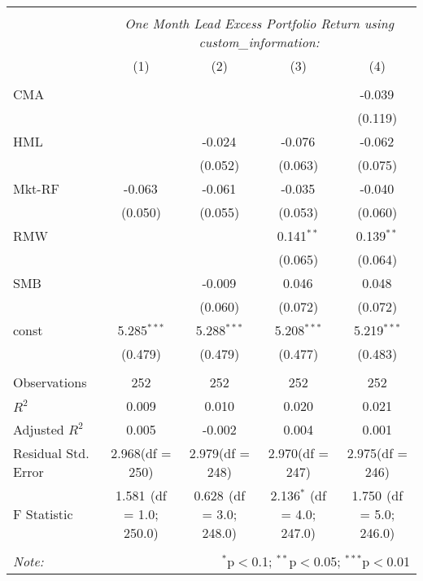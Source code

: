 \begin{table}[!htbp] \centering
\begin{tabular}{@{\extracolsep{5pt}}lcccc}
\\[-1.8ex]\hline
\hline \\[-1.8ex]
& \multicolumn{4}{c}{\textit{One Month Lead Excess Portfolio Return using custom_information:}} \
\cr \cline{4-5}
\\[-1.8ex] & (1) & (2) & (3) & (4) \\
\hline \\[-1.8ex]
 CMA & & & & -0.039$^{}$ \\
  & & & & (0.119) \\
 HML & & -0.024$^{}$ & -0.076$^{}$ & -0.062$^{}$ \\
  & & (0.052) & (0.063) & (0.075) \\
 Mkt-RF & -0.063$^{}$ & -0.061$^{}$ & -0.035$^{}$ & -0.040$^{}$ \\
  & (0.050) & (0.055) & (0.053) & (0.060) \\
 RMW & & & 0.141$^{**}$ & 0.139$^{**}$ \\
  & & & (0.065) & (0.064) \\
 SMB & & -0.009$^{}$ & 0.046$^{}$ & 0.048$^{}$ \\
  & & (0.060) & (0.072) & (0.072) \\
 const & 5.285$^{***}$ & 5.288$^{***}$ & 5.208$^{***}$ & 5.219$^{***}$ \\
  & (0.479) & (0.479) & (0.477) & (0.483) \\
\hline \\[-1.8ex]
 Observations & 252 & 252 & 252 & 252 \\
 $R^2$ & 0.009 & 0.010 & 0.020 & 0.021 \\
 Adjusted $R^2$ & 0.005 & -0.002 & 0.004 & 0.001 \\
 Residual Std. Error & 2.968(df = 250) & 2.979(df = 248) & 2.970(df = 247) & 2.975(df = 246)  \\
 F Statistic & 1.581$^{}$ (df = 1.0; 250.0) & 0.628$^{}$ (df = 3.0; 248.0) & 2.136$^{*}$ (df = 4.0; 247.0) & 1.750$^{}$ (df = 5.0; 246.0) \\
\hline
\hline \\[-1.8ex]
\textit{Note:} & \multicolumn{4}{r}{$^{*}$p$<$0.1; $^{**}$p$<$0.05; $^{***}$p$<$0.01} \\
\end{tabular}
\end{table}
